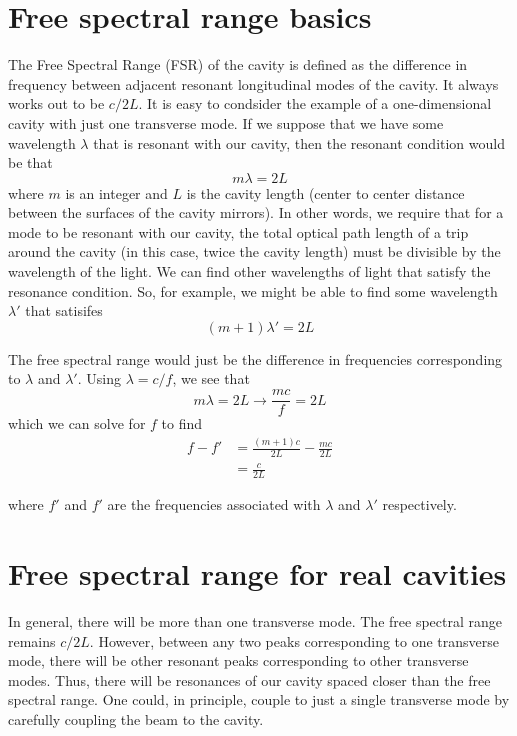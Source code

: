 \section{Free spectral range basics}
The Free Spectral Range (FSR) of the cavity is defined as the difference in frequency between adjacent resonant longitudinal modes of the cavity. It always works out to be $c/2L$. 
It is easy to condsider the example of a one-dimensional cavity with just one transverse mode. If we suppose that we have some wavelength $\lambda$ that is resonant with our cavity, then the resonant condition would be that 
\begin{equation}
m\lambda=2L
\end{equation}
where $m$ is an integer and $L$ is the cavity length (center to center distance between the surfaces of the cavity mirrors). In other words, we require that for a mode to be resonant with our cavity, the total optical path length of a trip around the cavity (in this case, twice the cavity length) must be divisible by the wavelength of the light. We can find other wavelengths of light that satisfy the resonance condition. So, for example, we might be able to find some wavelength $\lambda'$ that satisifes
\begin{equation}
(m+1)\lambda'=2L
\end{equation}

The free spectral range would just be the difference in frequencies corresponding to $\lambda$ and $\lambda'$. Using $\lambda = c/f$, we see that 
\begin{equation}
m\lambda= 2L \rightarrow \frac{mc}{f}=2L
\end{equation}
which we can solve for $f$ to find 
\begin{align}
f-f'&= \frac{(m+1)c}{2L}-\frac{m c}{2L}\\
&= \frac{c}{2L}
\end{align}

where $f'$ and $f'$ are the frequencies associated with $\lambda$ and $\lambda'$ respectively. 

\section{Free spectral range for real cavities}
In general, there will be more than one transverse mode. The free spectral range remains $c/2L$. However, between any two peaks corresponding to one transverse mode, there will be other resonant peaks corresponding to other transverse modes. Thus, there will be resonances of our cavity spaced closer than the free spectral range. One could, in principle, couple to just a single transverse mode by carefully coupling the beam to the cavity.

